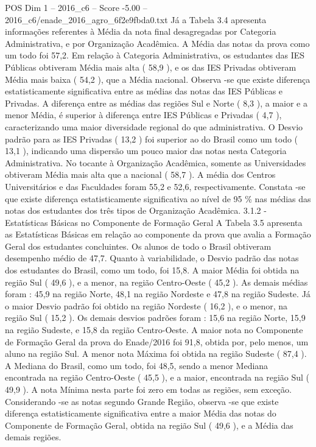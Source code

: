 \begin{textsample}{POS Dim 1 – 2016\_c6 – Score -5.00 – 2016\_c6/enade\_2016\_agro\_6f2e9fbda0.txt}
Já a Tabela 3.4 apresenta informações referentes à Média da nota final desagregadas por Categoria Administrativa, e por Organização Acadêmica.
A Média das notas da prova como um todo foi 57,2.
Em relação à Categoria Administrativa, os estudantes das IES Públicas obtiveram Média mais alta ( 58,9 ), e os das IES Privadas obtiveram Média mais baixa ( 54,2 ), que a Média nacional.
Observa -se que existe diferença estatisticamente significativa entre as médias das notas das IES Públicas e Privadas.
A diferença entre as médias das regiões Sul e Norte ( 8,3 ), a maior e a menor Média, é superior à diferença entre IES Públicas e Privadas ( 4,7 ), caracterizando uma maior diversidade regional do que administrativa.
O Desvio padrão para as IES Privadas ( 13,2 ) foi superior ao do Brasil como um todo ( 13,1 ), indicando uma dispersão um pouco maior das notas nesta Categoria Administrativa.
No tocante à Organização Acadêmica, somente as Universidades obtiveram Média mais alta que a nacional ( 58,7 ).
A média dos Centros Universitários e das Faculdades foram 55,2 e 52,6, respectivamente.
Constata -se que existe diferença estatisticamente significativa ao nível de 95 \% nas médias das notas dos estudantes dos três tipos de Organização Acadêmica. 3.1.2 - Estatísticas Básicas no Componente de Formação Geral A Tabela 3.5 apresenta as Estatísticas Básicas em relação ao componente da prova que avalia a Formação Geral dos estudantes concluintes.
Os alunos de todo o Brasil obtiveram desempenho médio de 47,7.
Quanto à variabilidade, o Desvio padrão das notas dos estudantes do Brasil, como um todo, foi 15,8.
A maior Média foi obtida na região Sul ( 49,6 ), e a menor, na região Centro-Oeste ( 45,2 ).
As demais médias foram : 45,9 na região Norte, 48,1 na região Nordeste e 47,8 na região Sudeste.
Já o maior Desvio padrão foi obtido na região Nordeste ( 16,2 ), e o menor, na região Sul ( 15,2 ).
Os demais desvios padrões foram : 15,6 na região Norte, 15,9 na região Sudeste, e 15,8 da região Centro-Oeste.
A maior nota no Componente de Formação Geral da prova do Enade/2016 foi 91,8, obtida por, pelo menos, um aluno na região Sul.
A menor nota Máxima foi obtida na região Sudeste ( 87,4 ).
A Mediana do Brasil, como um todo, foi 48,5, sendo a menor Mediana encontrada na região Centro-Oeste ( 45,5 ), e a maior, encontrada na região Sul ( 49,9 ).
A nota Mínima nesta parte foi zero em todas as regiões, sem exceção.
Considerando -se as notas segundo Grande Região, observa -se que existe diferença estatisticamente significativa entre a maior Média das notas do Componente de Formação Geral, obtida na região Sul ( 49,6 ), e a Média das demais regiões.

\end{textsample}
